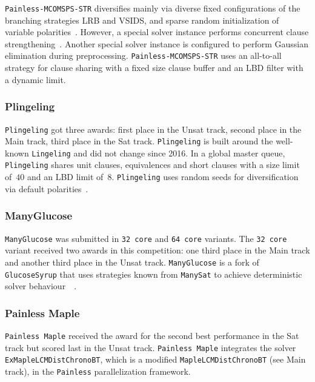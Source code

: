 \documentclass{elsarticle}
\newcommand{\solver}[1]{\texttt{#1}}
\begin{document}
\solver{Painless-MCOMSPS-STR} diversifies mainly via diverse fixed configurations of the branching strategies LRB and VSIDS, and sparse random initialization of variable polarities~\cite{Balyo:2015:Hordesat}. 
However, a special solver instance performs concurrent clause strengthening~\cite{Wieringa:2013:CCS}. 
Another special solver instance is configured to perform Gaussian elimination during preprocessing. 
\solver{Painless-MCOMSPS-STR} uses an all-to-all strategy for clause sharing with a fixed size clause buffer and an LBD filter with a dynamic limit. 


\subsubsection{Plingeling} 

\solver{Plingeling} got three awards: first place in the Unsat track, second place in the Main track, third place in the Sat track. 
\solver{Plingeling} is built around the well-known \solver{Lingeling} and did not change since 2016. 
In a global master queue, \solver{Plingeling} shares unit clauses, equivalences and short clauses with a size limit of~$40$ and an LBD limit of~$8$. 
\solver{Plingeling} uses random seeds for diversification via default polarities~\cite{Biere:SC2020,Biere:2012:Lingeling}. 


\subsubsection{ManyGlucose}

\solver{ManyGlucose} was submitted in \solver{32 core} and \solver{64 core} variants. 
The \solver{32 core} variant received two awards in this competition: one third place in the Main track and another third place in the Unsat track. 
\solver{ManyGlucose} is a fork of \solver{GlucoseSyrup} that uses strategies known from \solver{ManySat} to achieve deterministic solver behaviour~\cite{GlucoseSyrup}~\cite{ManySat}. 


\subsubsection{Painless Maple} 

\solver{Painless Maple} received the award for the second best performance in the Sat track but scored last in the Unsat track. 
\solver{Painless Maple} integrates the solver \solver{ExMapleLCMDistChronoBT}, which is a modified \solver{MapleLCMDistChronoBT} (see Main track), in the \solver{Painless} parallelization framework. 
\end{document}
